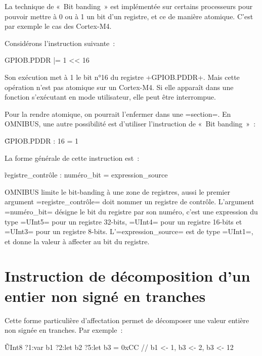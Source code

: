 
La technique de «~Bit banding~» est implémentée sur certains processeurs pour pouvoir mettre à 0 ou à 1 un bit d'un registre, et ce de manière atomique. C'est par exemple le cas des Cortex-M4.

Considérons l'instruction suivante~:
\begin{OMNIBUS}
GPIOB.PDDR |= 1 << 16
\end{OMNIBUS}
Son exécution met à 1 le bit n°16 du registre \omnibus+GPIOB.PDDR+. Mais cette opération n'est pas atomique sur un Cortex-M4. Si elle apparaît dans une fonction s'exécutant en mode utilisateur, elle peut être interrompue.

Pour la rendre atomique, on pourrait l'enfermer dans une \omnibus=section=. En OMNIBUS, une autre possibilité est d'utiliser l'instruction de «~Bit banding~»~:
\begin{OMNIBUS}
\~{GPIOB.PDDR : 16} = 1
\end{OMNIBUS}

La forme générale de cette instruction est~:
\begin{OMNIBUS}
\~{registre_contrôle : numéro_bit} = expression_source
\end{OMNIBUS}

OMNIBUS limite le bit-banding à une zone de registres, aussi le premier argument \omnibus=registre_contrôle= doit nommer un registre de contrôle. L'argument \omnibus=numéro_bit= désigne le bit du registre par son numéro, c'est une expression du type \omnibus=UInt5= pour un registre 32-bits, \omnibus=UInt4= pour un registre 16-bits et \omnibus=UInt3= pour un registre 8-bits.
L'\omnibus=expression_source= est de type \omnibus=UInt1=, et donne la valeur à affecter au bit du registre.






\section{Instruction de décomposition d'un entier non signé en tranches}

Cette forme particulière d'affectation permet de décomposer une valeur entière non signée en tranches. Par exemple~:
\begin{OMNIBUS}
\~{UInt8 ?1:var b1 ?2:let b2 ?5:let b3} = 0xCC // b1 <- 1, b3 <- 2, b3 <- 12
\end{OMNIBUS}

